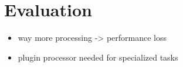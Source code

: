\chapter{Evaluation}


\begin{itemize}
  \item way more processing -> performance loss
  \item plugin processor needed for specialized tasks
\end{itemize}

